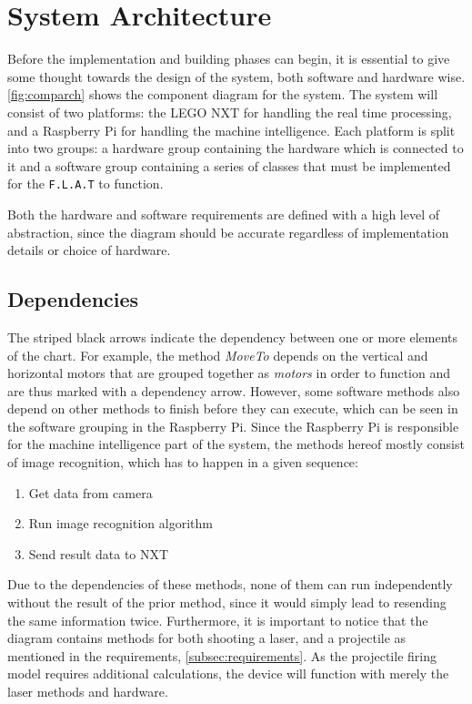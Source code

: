 \section{System Architecture}
\label{sec:architecture}
Before the implementation and building phases can begin, it is essential to give some thought towards the design of the system, both software and hardware wise.
\autoref{fig:comparch} shows the component diagram for the system.
The system will consist of two platforms: the LEGO NXT for handling the real time processing, and a Raspberry Pi for handling the machine intelligence.
Each platform is split into two groups: a hardware group containing the hardware which is connected to it and a software group containing a series of classes that must be implemented for the \texttt{F.L.A.T} to function.

Both the hardware and software requirements are defined with a high level of abstraction, since the diagram should be accurate regardless of implementation details or choice of hardware.

\subsection*{Dependencies}
The striped black arrows indicate the dependency between one or more elements of the chart.
For example, the method \textit{MoveTo} depends on the vertical and horizontal motors that are grouped together as \textit{motors} in order to function and are thus marked with a dependency arrow.
However, some software methods also depend on other methods to finish before they can execute, which can be seen in the software grouping in the Raspberry Pi.
Since the Raspberry Pi is responsible for the machine intelligence part of the system, the methods hereof mostly consist of image recognition, which has to happen in a given sequence:
\begin{enumerate}
\item Get data from camera
\item Run image recognition algorithm
\item Send result data to NXT
\end{enumerate}

Due to the dependencies of these methods, none of them can run independently without the result of the prior method, since it would simply lead to resending the same information twice.
Furthermore, it is important to notice that the diagram contains methods for both shooting a laser, and a projectile as mentioned in the requirements, \autoref{subsec:requirements}.
As the projectile firing model requires additional calculations, the device will function with merely the laser methods and hardware. 

